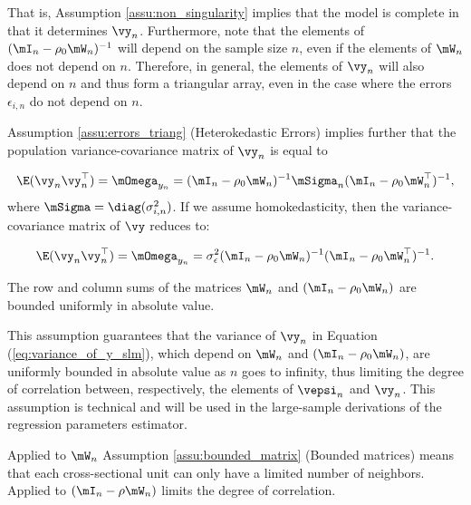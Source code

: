 \documentclass[english,12pt]{book}\usepackage[]{graphicx}\usepackage[]{xcolor}
\begin{document}
That is, Assumption \ref{assu:non_singularity} implies that the model is complete in that it determines $\vy_n$. Furthermore, \cite{kelejian1998generalized} note that the elements of $(\mI_n - \rho_0\mW_n)^{-1}$ will depend on the sample size $n$, even if the elements of $\mW_n$ does not depend on $n$. Therefore, in general, the elements of $\vy_n$ will also depend on $n$ and thus form a triangular array, even in the case where the errors $\epsilon_{i,n}$ do not depend on $n$. 

Assumption \ref{assu:errors_triang} (Heterokedastic Errors) implies further that the population variance-covariance matrix of $\vy_n$ is equal to

\begin{equation}\label{eq:variance_of_y_slm}
  \E(\vy_n\vy^\top_n) = \mOmega_{y_n}= (\mI_n - \rho_0\mW_n)^{-1}\mSigma_n(\mI_n - \rho_0\mW^\top_n)^{-1},
\end{equation}
%
where $\mSigma = \diag(\sigma^2_{i, n})$. If we assume homokedasticity, then the variance-covariance matrix of $\vy$ reduces to:

\begin{equation*}
  \E(\vy_n\vy^\top_n) = \mOmega_{y_n} = \sigma^2_{\epsilon}(\mI_n - \rho_0\mW_n)^{-1}(\mI_n - \rho_0\mW^\top_n)^{-1}.
\end{equation*}


\begin{assumption}\label{assu:bounded_matrix}
The row and column sums of the matrices $\mW_n$ and $(\mI_n - \rho_0\mW_n)$ are bounded uniformly in absolute value.
\end{assumption}


This assumption guarantees that the variance of $\vy_n$  in Equation (\ref{eq:variance_of_y_slm}), which depend on $\mW_n$ and $(\mI_n - \rho_0\mW_n)$, are uniformly bounded in absolute value as $n$ goes to infinity, thus limiting the degree of correlation between, respectively, the elements of $\vepsi_n$ and $\vy_n$. This assumption is technical and will be used in the large-sample derivations of the regression parameters estimator. 

\begin{remark}
Applied to $\mW_n$ Assumption \ref{assu:bounded_matrix} (Bounded matrices) means that each cross-sectional unit can only have a limited number of neighbors. Applied to $\left(\mI_n - \rho \mW_n\right)$ limits the degree of correlation. 
\end{remark}
\end{document}
